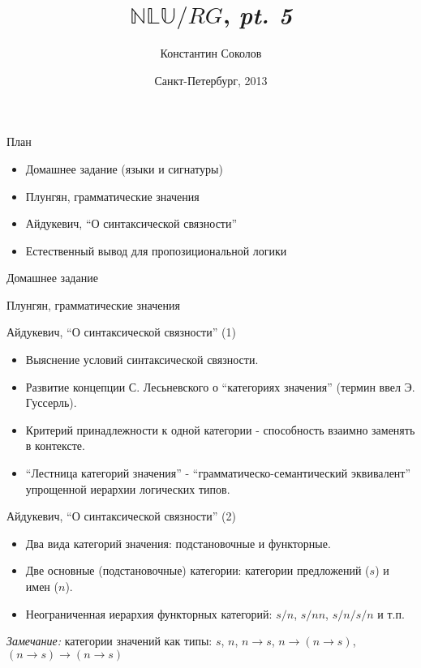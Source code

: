 \documentclass{beamer}
\begin{document}
\title{\huge{$\mathbb{NLU}/RG$, \textit{pt. 5}}}
\author{Константин Соколов}
\date{Санкт-Петербург, 2013} 
\begin{frame}
    \thispagestyle{empty}
    \titlepage
\end{frame}

\begin{frame}{План}
    \setcounter{framenumber}{1}
    \begin{itemize}
        \item Домашнее задание (языки и сигнатуры)
        \item Плунгян, грамматические значения
        \item Айдукевич, ``О синтаксической связности''
        \item Естественный вывод для пропозициональной логики
    \end{itemize}
\end{frame}

\begin{frame}{Домашнее задание}
\end{frame}

\begin{frame}{Плунгян, грамматические значения}
\end{frame}

\begin{frame}{Айдукевич, ``О синтаксической связности'' (1)}
\begin{itemize}
  \item Выяснение условий синтаксической связности.
  \item Развитие концепции С. Лесьневского о ``категориях значения'' (термин ввел Э. Гуссерль).
  \item Критерий принадлежности к одной категории - способность взаимно заменять в контексте.
  \item ``Лестница категорий значения'' - ``грамматическо-семантический эквивалент'' упрощенной иерархии логических типов.
\end{itemize}
\end{frame}

\begin{frame}{Айдукевич, ``О синтаксической связности'' (2)}
\begin{itemize}
  \item Два вида категорий значения: подстановочные и функторные.
  \item Две основные (подстановочные) категории: категории предложений ($s$) и имен ($n$).
  \item Неограниченная иерархия функторных категорий: $s/n$, $s/nn$, $s/n/s/n$  и т.п.
\end{itemize}
\bigskip
\textit{Замечание:} категории значений как типы: $s$, $n$, $n \to s$, $n \to (n \to s)$, $(n \to s) \to (n \to s)$
\end{frame}
\end{document}

